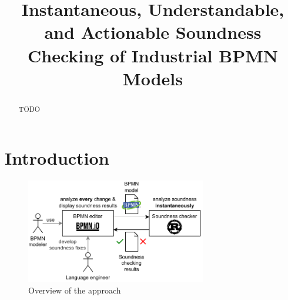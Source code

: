 \documentclass[runningheads]{llncs}
\begin{document}
%
\title{Instantaneous, Understandable, and Actionable Soundness Checking of Industrial BPMN Models}
%
%
%
\maketitle              %
%
\begin{abstract}
TODO
\end{abstract}


\section{Introduction} \label{sec:introduction}
\cite{fahlandAnalysisDemandInstantaneous2011}


\begin{figure}[ht]
	\centering
	\includegraphics[width=0.7\textwidth]{images/overview}
	\caption{Overview of the approach}
	\label{fig:overview}
\end{figure}
\end{document}
